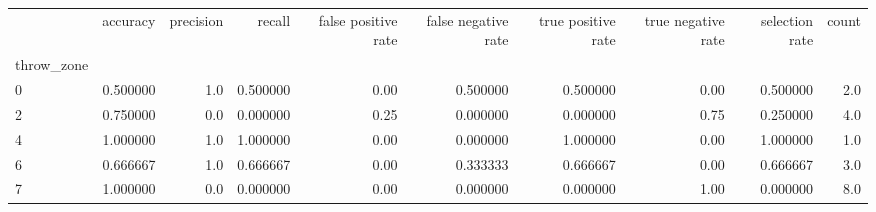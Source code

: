 \begin{tabular}{lrrrrrrrrr}
\toprule
{} &  accuracy &  precision &    recall &  false positive rate &  false negative rate &  true positive rate &  true negative rate &  selection rate &  count \\
throw\_zone &           &            &           &                      &                      &                     &                     &                 &        \\
\midrule
0          &  0.500000 &        1.0 &  0.500000 &                 0.00 &             0.500000 &            0.500000 &                0.00 &        0.500000 &    2.0 \\
2          &  0.750000 &        0.0 &  0.000000 &                 0.25 &             0.000000 &            0.000000 &                0.75 &        0.250000 &    4.0 \\
4          &  1.000000 &        1.0 &  1.000000 &                 0.00 &             0.000000 &            1.000000 &                0.00 &        1.000000 &    1.0 \\
6          &  0.666667 &        1.0 &  0.666667 &                 0.00 &             0.333333 &            0.666667 &                0.00 &        0.666667 &    3.0 \\
7          &  1.000000 &        0.0 &  0.000000 &                 0.00 &             0.000000 &            0.000000 &                1.00 &        0.000000 &    8.0 \\
\bottomrule
\end{tabular}
